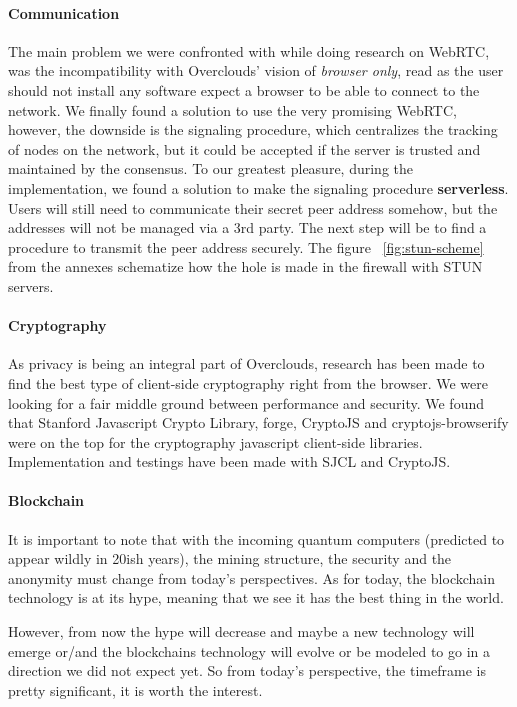 \paragraph{Communication} The main problem we were confronted with while doing research on WebRTC, was the incompatibility with Overclouds' vision of \textit{browser only}, read as the user should not install any software expect a browser to be able to connect to the network. We finally found a solution to use the very promising WebRTC, however, the downside is the signaling procedure, which centralizes the tracking of nodes on the network, but it could be accepted if the server is trusted and maintained by the consensus. To our greatest pleasure, during the implementation, we found a solution to make the signaling procedure \textbf{serverless}. Users will still need to communicate their secret peer address somehow, but the addresses will not be managed via a 3rd party. The next step will be to find a procedure to transmit the peer address securely. The figure ~\ref{fig:stun-scheme} from the annexes schematize how the hole is made in the firewall with STUN servers.

\paragraph{Cryptography}
As privacy is being an integral part of Overclouds, research has been made to find the best type of client-side cryptography right from the browser. We were looking for a fair middle ground between performance and security. We found that Stanford Javascript Crypto Library\cite{Stark2009SymmetricJavascript}, forge\cite{DigitalBazaar2016Forge}, CryptoJS\cite{Brix2013CryptoJS} and cryptojs-browserify\cite{Tarr2013Crypto-Browserify} were on the top for the cryptography javascript client-side libraries. Implementation and testings have been made with SJCL and CryptoJS.

\paragraph{Blockchain}
It is important to note that with the incoming quantum computers (predicted to appear wildly in 20ish years), the mining structure, the security and the anonymity must change from today's perspectives. As for today, the blockchain technology is at its hype, meaning that we see it has the best thing in the world.

However, from now the hype will decrease and maybe a new technology will emerge or/and the blockchains technology will evolve or be modeled to go in a direction we did not expect yet. So from today's perspective, the timeframe is pretty significant, it is worth the interest.


